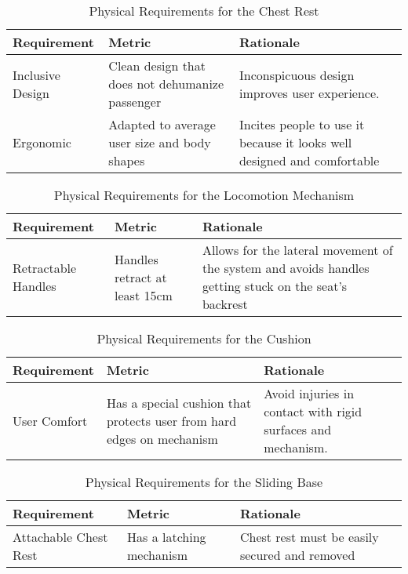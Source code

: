 \clearpage
\newpage


\begin{table}
\begin{tabular} {| p{4cm} | p{5cm} | p{5cm} |}
\hline
\textbf{Requirement} & \textbf{Metric} & \textbf{Rationale} \\ \hline

Inclusive Design &  Clean design that does not dehumanize passenger &  Inconspicuous design improves user experience. \\ \hline
Ergonomic & Adapted to average user size and body shapes & Incites people to use it because it looks well designed and comfortable  \\ \hline
\end{tabular} 
\caption{Physical Requirements for the Chest Rest}
\label{tab:physical_requirements_chestrest}
\end{table}

\begin{table}
\begin{tabular} {| p{4cm} | p{5cm} | p{5cm} |}
\hline
\textbf{Requirement} & \textbf{Metric} & \textbf{Rationale} \\ \hline
Retractable Handles & Handles retract at least 15cm & Allows for the lateral movement of the system and avoids handles getting stuck on the seat's backrest\\ \hline
\end{tabular} 
\caption{Physical Requirements for the Locomotion Mechanism}
\label{tab:physical_requirements_lococomotion}
\end{table}

\begin{table}
\begin{tabular} {| p{4cm} | p{5cm} | p{5cm} |}
\hline
\textbf{Requirement} & \textbf{Metric} & \textbf{Rationale} \\ \hline
User Comfort
 & Has a special cushion that protects user from hard edges on mechanism & Avoid injuries in contact with rigid surfaces and mechanism.\\ \hline
\end{tabular} 
\caption{Physical Requirements for the Cushion}
\label{tab:physical_requirements_cushion}
\end{table}


\begin{table}
\begin{tabular} {| p{4cm} | p{5cm} | p{5cm} |}
\hline
\textbf{Requirement} & \textbf{Metric} & \textbf{Rationale} \\ \hline
Attachable Chest Rest & Has a latching mechanism & Chest rest must be easily secured and removed\\ \hline
\end{tabular} 
\caption{Physical Requirements for the Sliding Base}
\label{tab:physical_requirements_sliding}
\end{table}
\clearpage
\newpage

